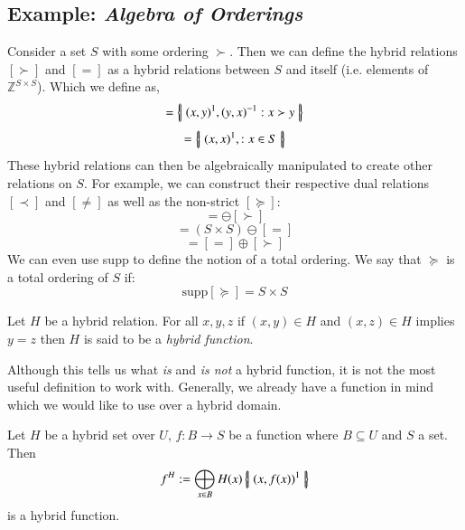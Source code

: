\subsection{Example: \emph{Algebra of Orderings}}
Consider a set $S$ with some ordering $\succ$.
Then we can define the hybrid relations $[\succ]$ and $[=]$ as a hybrid relations between $S$ and itself 
(i.e. elements of $\mathbb{Z}^{S\times S}$).
Which we define as,
\begin{equation}
	[\succ] = \hset{ (x,y)^1, (y,x)^{-1} : x \succ y }
\end{equation}
\begin{equation}
	[=] = \hset{ (x,x)^1, : x \in S }
\end{equation}
These hybrid relations can then be algebraically manipulated to create other relations on $S$.
For example, we can construct their respective dual relations $[\prec]$ and $[\neq]$ as well as the non-strict $[\succeq]$:
\begin{equation}
	[\prec] = \ominus [\succ]
\end{equation}
\begin{equation}
	[\neq] = (S\times S) \ominus [=]
\end{equation}
\begin{equation}
	[\succeq] = [=] \oplus [\succ]
\end{equation}
We can even use supp to define the notion of a total ordering.
We say that $\succeq$ is a total ordering of $S$ if:
\begin{equation}
	\text{supp}[\succeq] = S \times S
\end{equation}

\newpage
\begin{definition}
Let $H$ be a hybrid relation. For all $x,y,z$ if $(x,y) \in H$ and $(x,z) \in H$ implies $y=z$ then $H$ is said to be a \emph{hybrid function}.
\end{definition}

Although this tells us what \emph{is} and \emph{is not} a hybrid function, it is not the most useful definition to work with. Generally, we already have a function in mind which we would like to use over a hybrid domain.

\begin{theorem}
Let $H$ be a hybrid set over $U$, $f:B \to S$ be a function where $B \subseteq U$ and $S$ a set. Then
\begin{equation}
f^H := \bigoplus_{x \in B} H(x) \left\{ \! \left| \;  (x, f(x) )^1  \; \right| \! \right\}
\end{equation}
is a hybrid function.
\end{theorem}

